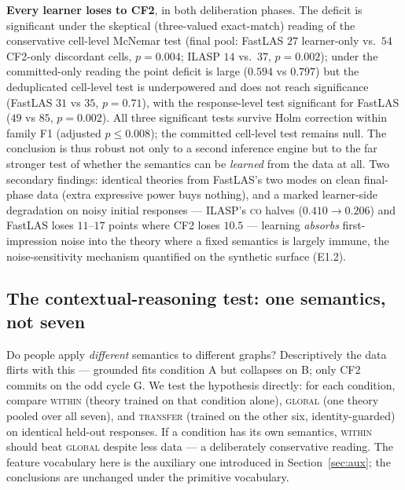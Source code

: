 \documentclass[review,12pt]{elsarticle}
\theoremstyle{definition}
\theoremstyle{remark}
\newcommand{\co}{\textsc{co}}
\begin{document}
\noindent\textbf{Every learner loses to CF2}, in both deliberation phases. The
deficit is significant under the skeptical (three-valued exact-match) reading
of the conservative cell-level McNemar test (final pool: FastLAS $27$
learner-only vs.\ $54$ CF2-only discordant cells, $p=0.004$; ILASP $14$ vs.\
$37$, $p=0.002$); under the committed-only reading the point deficit is large
($0.594$ vs $0.797$) but the deduplicated cell-level test is underpowered and
does not reach significance (FastLAS $31$ vs $35$, $p=0.71$), with the
response-level test significant for FastLAS ($49$ vs $85$, $p=0.002$). All
three significant tests survive Holm correction within family F1
(adjusted $p\le0.008$); the committed cell-level test remains null. The \citeauthor{guillaume2022} conclusion is
thus robust not only to a second inference engine but to the far stronger test
of whether the semantics can be \emph{learned} from the data at all. Two
secondary findings: identical theories from FastLAS's two modes on clean
final-phase data (extra expressive power buys nothing), and a marked
learner-side degradation on noisy initial responses --- ILASP's \co{} halves
($0.410\to0.206$) and FastLAS loses $11$--$17$ points where CF2 loses $10.5$
--- learning \emph{absorbs} first-impression noise into the theory where a
fixed semantics is largely immune, the noise-sensitivity mechanism quantified
on the synthetic surface (E1.2).

\subsection{The contextual-reasoning test: one semantics, not seven}
\label{sec:act3}

Do people apply \emph{different} semantics to different graphs? Descriptively
the data flirts with this --- grounded fits condition A but collapses on B; only
CF2 commits on the odd cycle G. We test the hypothesis directly: for each
condition, compare \textsc{within} (theory trained on that condition alone),
\textsc{global} (one theory pooled over all seven), and \textsc{transfer}
(trained on the other six, identity-guarded) on identical held-out responses.
If a condition has its own semantics, \textsc{within} should beat
\textsc{global} despite less data --- a deliberately conservative reading. The
feature vocabulary here is the auxiliary one introduced in
Section~\ref{sec:aux}; the conclusions are unchanged under the primitive
vocabulary.
\end{document}
